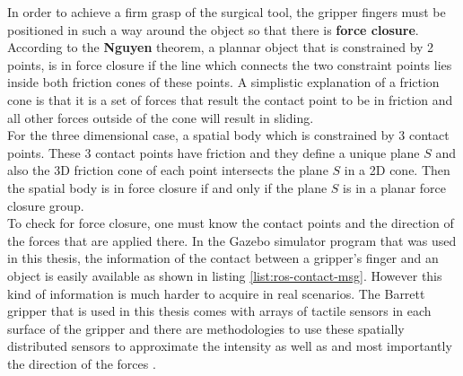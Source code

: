 In order to achieve a firm grasp of the surgical tool, the gripper fingers must be positioned in such a way around the object so that there is \textbf{force closure}. According to the \textbf{Nguyen} theorem, a plannar 
object that is constrained by 2 points, is in force closure if the line which connects the two constraint points lies inside both friction cones of these points. A simplistic explanation of a friction cone is 
that it is a set of forces that result the contact point to be in friction and all other forces outside of the cone will result in sliding. \\

For the three dimensional case, a spatial body which is constrained by 3 contact points. These 3 contact points have friction and they define a unique plane $S$ and also the 3D friction cone of each point 
intersects the plane $S$ in a 2D cone. Then the spatial body is in force closure if and only if the plane $S$ is in a planar force closure group.\\

To check for force closure, one must know the contact points and the direction of the forces that are applied there. In the Gazebo simulator program that was used in this thesis, the information of the contact 
between a gripper's finger and an object is easily available as shown in listing \ref{list:ros-contact-msg}. However this kind of information is much harder to acquire in real scenarios. The Barrett gripper that is used in this thesis comes with arrays 
of tactile sensors in each surface of the gripper and there are methodologies to use these spatially distributed sensors to approximate the intensity as well as and most importantly the direction of the forces \cite{tactile-sensors-force}.



